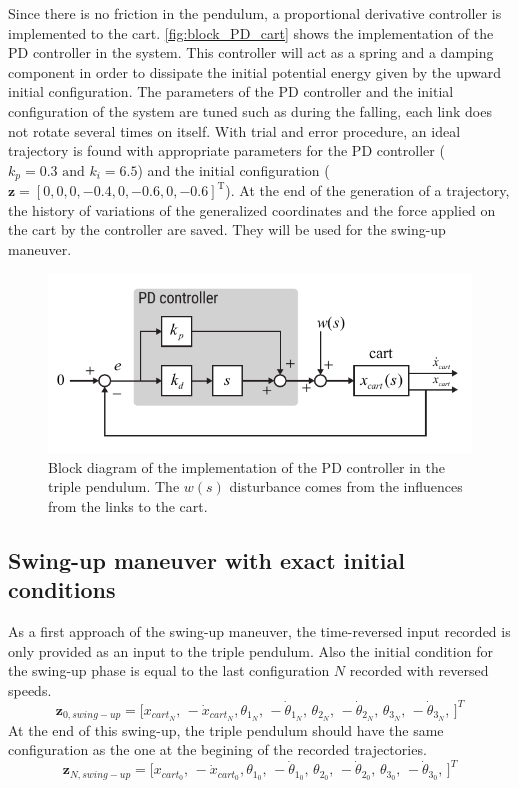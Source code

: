 \documentclass[a4paper,12pt]{article}
\begin{document}
Since there is no friction in the pendulum, a proportional derivative controller is implemented to the cart. \autoref{fig:block_PD_cart} shows the implementation of the PD controller in the system. This controller will act as a spring and a damping component in order to dissipate the initial potential energy given by the upward initial configuration. The parameters of the PD controller and the initial configuration of the system are tuned such as during the falling, each link does not rotate several times on itself. With trial and error procedure, an ideal trajectory is found with appropriate parameters for the PD controller ($k_p=\num{0.3}\text{ and } k_i=\num{6.5}$) and the initial configuration ($\mathbf{z} = [0,0,0,\num{-0.4},0,\num{-0.6},0,\num{-0.6}]^\text{T}$). At the end of the generation of a trajectory, the history of variations of the generalized coordinates and the force applied on the cart by the controller are saved. They will be used for the swing-up maneuver.
\begin{figure}[ht]
	\centering
	\includegraphics[width=15cm]{illustrations/block_PD_cart.pdf}
	\caption{Block diagram of the implementation of the PD controller in the triple pendulum. The $w(s)$ disturbance comes from the influences from the links to the cart.}
	\label{fig:block_PD_cart}
\end{figure}

\subsection{Swing-up maneuver with exact initial conditions}
As a first approach of the swing-up maneuver, the time-reversed input recorded is only provided as an input to the triple pendulum. Also the initial condition for the swing-up phase is equal to the last configuration $N$ recorded with reversed speeds.
\[
\mathbf{z}_{0,swing-up} = \big[ x_{cart_N},\, -\dot x_{cart_N} , \theta_{1_{N}},\, -\dot\theta_{1_{N}},\, \theta_{2_{N}},\, -\dot\theta_{2_{N}},\, \theta_{3_{N}},\, -\dot\theta_{3_{N}},\,  \big]^T
\]
At the end of this swing-up, the triple pendulum should have the same configuration as the one at the begining of the recorded trajectories.
\[
\mathbf{z}_{N,swing-up} = \big[ x_{cart_0},\, -\dot x_{cart_0} , \theta_{1_{0}},\, -\dot\theta_{1_{0}},\, \theta_{2_{0}},\, -\dot\theta_{2_{0}},\, \theta_{3_{0}},\, -\dot\theta_{3_{0}},\,  \big]^T
\]
\end{document}
